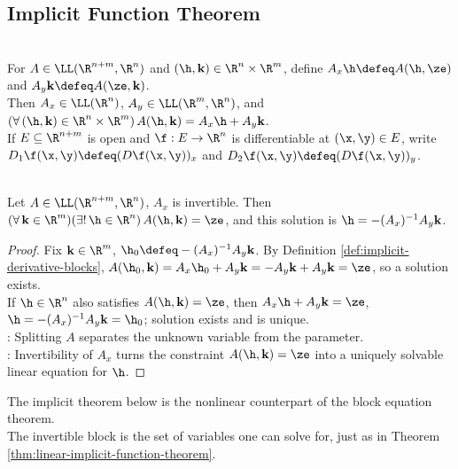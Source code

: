 \subsection{Implicit Function Theorem}

\begin{definition} \label{def:implicit-derivative-blocks} \\
For $A\in\LL(\R^{n+m},\R^n)$ and $(\h,\mathbf{k})\in\R^n\times\R^m$, define $A_x\h\defeq A(\h,\ze)$ and $A_y\mathbf{k}\defeq A(\ze,\mathbf{k})$.\\
Then $A_x\in\LL(\R^n)$, $A_y\in\LL(\R^m,\R^n)$, and $(\forall\,(\h,\mathbf{k})\in\R^n\times\R^m)\,A(\h,\mathbf{k})=A_x\h+A_y\mathbf{k}$.\\
If $E\subseteq\R^{n+m}$ is open and $\f:E\to\R^n$ is differentiable at $(\x,\y)\in E$, write $D_1\f(\x,\y)\defeq(D\f(\x,\y))_x$ and $D_2\f(\x,\y)\defeq(D\f(\x,\y))_y$.
\end{definition}

\begin{theorem} \label{thm:linear-implicit-function-theorem} \\
Let $A\in\LL(\R^{n+m},\R^n)$, $A_x$ is invertible. Then $(\forall\,\mathbf{k}\in\R^m)(\exists!\,\h\in\R^n)\,A(\h,\mathbf{k})=\ze$, and this solution is $\h=-(A_x)^{-1}A_y\mathbf{k}$.
\begin{proof}
Fix $\mathbf{k}\in\R^m$, $\h_0\defeq-(A_x)^{-1}A_y\mathbf{k}$. By Definition \ref{def:implicit-derivative-blocks}, $A(\h_0,\mathbf{k})=A_x\h_0+A_y\mathbf{k}=-A_y\mathbf{k}+A_y\mathbf{k}=\ze$, so a solution exists.\\
If $\h\in\R^n$ also satisfies $A(\h,\mathbf{k})=\ze$, then $A_x\h+A_y\mathbf{k}=\ze$, $\h=-(A_x)^{-1}A_y\mathbf{k}=\h_0$; solution exists and is unique.\\
: Splitting $A$ separates the unknown variable from the parameter.\\
: Invertibility of $A_x$ turns the constraint $A(\h,\mathbf{k})=\ze$ into a uniquely solvable linear equation for $\h$.
\end{proof}
\end{theorem}

The implicit theorem below is the nonlinear counterpart of the block equation theorem.\\
The invertible block is the set of variables one can solve for, just as in Theorem \ref{thm:linear-implicit-function-theorem}.

